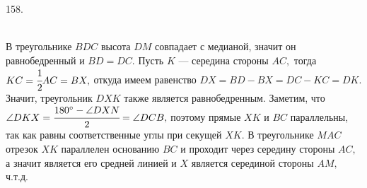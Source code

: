 158. \begin{figure}[ht!]
\end{figure}\\
В треугольнике $BDC$ высота $DM$ совпадает с медианой, значит он равнобедренный и $BD=DC.$ Пусть $K$ --- середина стороны $AC,$ тогда $KC=\cfrac{1}{2} AC=BX,$ откуда имеем равенство $DX=BD-BX=DC-KC=DK.$ Значит, треугольник $DXK$ также является равнобедренным. Заметим, что $\angle DKX=\cfrac{180^\circ-\angle DXN}{2}=\angle DCB,$ поэтому прямые $XK$ и $BC$ параллельны, так как равны соответственные углы при секущей $XK.$ В треугольнике $MAC$ отрезок $XK$ параллелен основанию $BC$ и проходит через середину стороны $AC,$ а значит является его средней линией и $X$ является серединой стороны $AM,$ ч.т.д.\\
